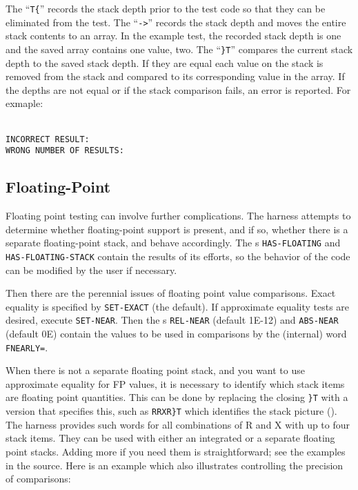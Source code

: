 The ``\texttt{T\{}'' records the stack depth prior to the test code
so that they can be eliminated from the test.
The ``\texttt{->}'' records the stack depth and moves the entire stack
contents to an array.  In the example test, the recorded stack depth
is one and the saved array contains one value, two.
The ``\texttt{\}T}'' compares the current stack depth to the saved
stack depth.  If they are equal each value on the stack is removed
from the stack and compared to its corresponding value in the array.
If the depths are not equal or if the stack comparison fails, an error
is reported.  For exmaple:

 \\
 \texttt{INCORRECT RESULT:}  \\
   \texttt{WRONG NUMBER OF RESULTS:}  \\

\subsection{Floating-Point}

Floating point testing can involve further complications.  The harness
attempts to determine whether floating-point support is present, and
if so, whether there is a separate floating-point stack, and behave
accordingly.  The s \texttt{HAS-FLOATING} and
\texttt{HAS-FLOATING-STACK} contain the results of its efforts, so
the behavior of the code can be modified by the user if necessary.

Then there are the perennial issues of floating point value
comparisons.  Exact equality is specified by \texttt{SET-EXACT}
(the default).  If approximate equality tests are desired, execute
\texttt{SET-NEAR}.  Then the \linebreak
{}s \texttt{REL-NEAR} (default 1E-12) and
\texttt{ABS-NEAR} (default 0E) contain the values to be used in
comparisons by the (internal) word \texttt{FNEARLY=}.

When there is not a separate floating point stack, and you want to use
approximate equality for FP values, it is necessary to identify which
stack items are floating point quantities.  This can be done by
replacing the closing \texttt{\}T} with a version that specifies
this, such as \texttt{RRXR\}T} which identifies the stack picture
\linebreak ().  The harness provides such words for all
combinations of R and X with up to four stack items.  They can be
used with either an integrated or a separate floating point stacks.
Adding more if you need them is straightforward; see the examples in
the source.  Here is an example which also illustrates controlling
the precision of comparisons:

